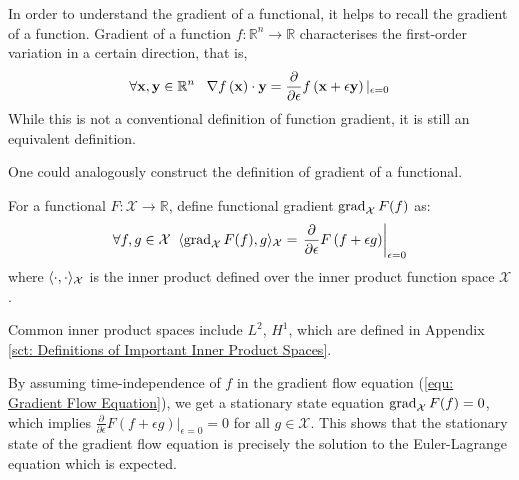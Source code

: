 \documentclass[../dissertation.tex]{subfiles}
\begin{document}
In order to understand the gradient of a functional, it helps to recall the gradient of a function.
Gradient of a function $f:\mathbb{R}^n \rightarrow \mathbb{R}$ characterises the first-order variation in a certain direction,
that is,
\begin{equation}
    \forall \mathbf{x}, \mathbf{y} \in \mathbb{R}^n \; \; \;
    \nabla f \left( \mathbf{x} \right) \cdot \mathbf{y} = \frac{\partial}{\partial \epsilon} f\left( \mathbf{x} + \epsilon \mathbf{y} \right)|_{\epsilon=0}
\end{equation}
While this is not a conventional definition of function gradient, it is still an equivalent definition.

One could analogously construct the definition of gradient of a functional.
\begin{definition}
    For a functional $F:\mathcal{X} \rightarrow \mathbb{R}$, define functional gradient $\operatorname{grad}_{\mathcal{X}} F (f)$ as:
    \begin{equation}
        \forall f, g \in \mathcal{X} \; \; \langle \operatorname{grad}_{\mathcal{X}} F (f), g \rangle_{\mathcal{X}} = \left.\frac{\partial}{\partial \epsilon} F \left( f + \epsilon g \right)\right|_{\epsilon = 0}
        \label{equ: Functional Gradient Definition}
    \end{equation}
    where $\langle \cdot, \cdot \rangle_{\mathcal{X}}$ is the inner product defined over the inner product function space $\mathcal{X}$.
\end{definition}

Common inner product spaces include $L^2$, $H^1$, which are defined in Appendix \ref{sct: Definitions of Important Inner Product Spaces}.

\begin{remark}
    By assuming time-independence of $f$ in the gradient flow equation (\ref{equ: Gradient Flow Equation}), we get a stationary state equation $\operatorname{grad}_{\mathcal{X}} F(f) = 0$,
    which implies $\frac{\partial}{\partial \epsilon} F \left( f + \epsilon g \right)|_{\epsilon=0} = 0$ for all $g \in \mathcal{X}$.
    This shows that the stationary state of the gradient flow equation is precisely the solution to the Euler-Lagrange equation which is expected.
\end{remark}
\end{document}

